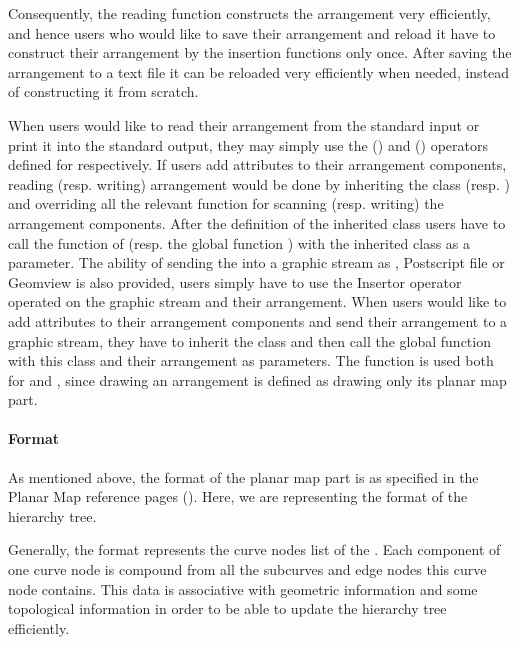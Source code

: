 \begin{itemize}
\begin{ccAdvanced}
Consequently, the reading function constructs the arrangement very 
efficiently, and hence users who would like to save their arrangement and 
reload it have to construct their  arrangement by the insertion functions 
only once. After saving the arrangement to a text file it can be reloaded 
very efficiently when needed, instead of constructing it from scratch.

When users would like to read their arrangement from the standard input or 
print it into the standard output, they may simply use the  
(\ccc{ >> }) and  (\ccc{ << }) operators defined for 
 respectively. 
If users add attributes to their arrangement components, reading (resp. 
writing) arrangement would be done by inheriting the class 
  (resp.  ) 
and overriding all the relevant function for scanning (resp. writing) the 
arrangement components. After the definition of the inherited class users 
have to call the function  of  (resp. the 
global function  ) with the inherited class as a parameter.
The ability of sending the  into a graphic stream as 
, Postscript file or Geomview is also provided, 
users simply have to use the Insertor operator operated on the graphic 
stream and their arrangement. When users would like to add attributes to 
their arrangement components and send their arrangement to a graphic stream, 
they have to inherit the class  and then call the global 
function  with this class and their arrangement as parameters.
The function   is used both for  and 
, since drawing an arrangement is defined as drawing only 
its planar map part.

\paragraph{Format}
As mentioned above, the format of the planar map part is as specified 
in the Planar Map reference pages (). 
Here, we are representing the format of the hierarchy tree.

Generally, the format represents the curve nodes list of the 
. Each component of one curve node is compound from all the 
subcurves and edge nodes this curve node contains. This data is associative 
with geometric information and some topological information in order to be 
able to update the hierarchy tree efficiently. 


\end{ccAdvanced}
\end{itemize}
